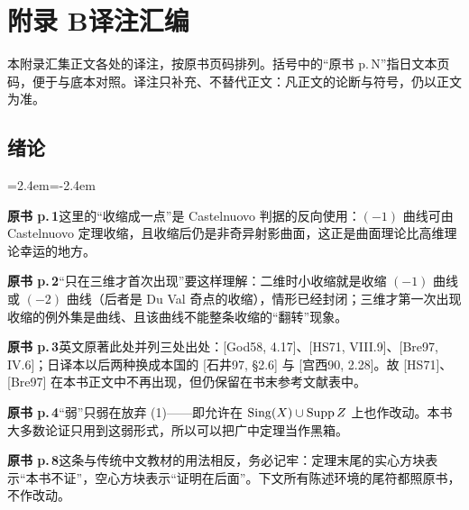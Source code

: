 \chapter*{附录 B\quad 译注汇编}

本附录汇集正文各处的译注，按原书页码排列。括号中的“原书 p.\,N”指日文本页码，便于与底本对照。译注只补充、不替代正文：凡正文的论断与符号，仍以正文为准。

\section*{绪论}
\begin{list}{}{\leftmargin=2.4em\itemindent=-2.4em\itemsep=2pt\parsep=0pt}
\item \textbf{原书 p.\,1}\quad 这里的“收缩成一点”是 Castelnuovo 判据的反向使用：$(-1)$ 曲线可由 Castelnuovo 定理收缩，且收缩后仍是非奇异射影曲面，这正是曲面理论比高维理论幸运的地方。
\item \textbf{原书 p.\,2}\quad “只在三维才首次出现”要这样理解：二维时小收缩就是收缩 $(-1)$ 曲线或 $(-2)$ 曲线（后者是 Du Val 奇点的收缩），情形已经封闭；三维才第一次出现收缩的例外集是曲线、且该曲线不能整条收缩的“翻转”现象。
\item \textbf{原书 p.\,3}\quad 英文原著此处并列三处出处：[God58, 4.17]、[HS71, VIII.9]、[Bre97, IV.6]；日译本以后两种换成本国的 [石井97, §2.6] 与 [宫西90, 2.28]。故 [HS71]、[Bre97] 在本书正文中不再出现，但仍保留在书末参考文献表中。
\item \textbf{原书 p.\,4}\quad “弱”只弱在放弃 (1)——即允许在 $\operatorname{Sing}(X)\cup\operatorname{Supp} Z$ 上也作改动。本书大多数论证只用到这弱形式，所以可以把广中定理当作黑箱。
\item \textbf{原书 p.\,8}\quad 这条与传统中文教材的用法相反，务必记牢：定理末尾的实心方块表示“本书不证”，空心方块表示“证明在后面”。下文所有陈述环境的尾符都照原书，不作改动。
\end{list}

